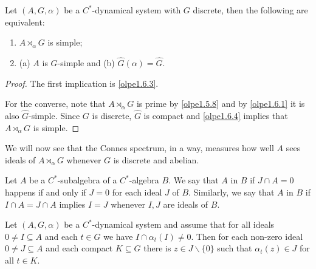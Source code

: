 \begin{theorem}
	Let $(A, G ,\alpha)$ be a $C^*$-dynamical system with $G$ discrete, then the following are equivalent:
	\begin{enumerate}
		\item $A \rtimes_\alpha G$ is simple;
		\item (a) $A$ is $G$-simple and (b) $\hat G(\alpha) = \hat G$.
	\end{enumerate}
	\label{olpe1thm}
\end{theorem}
\begin{proof}
	The first implication is \cref{olpe1.6.3}. 
	
	For the converse, note that $A \rtimes_\alpha G$ is prime by \cref{olpe1.5.8} and by \cref{olpe1.6.1} it is also $\hat G$-simple. Since $G$ is discrete, $\hat G$ is compact and \cref{olpe1.6.4} implies that $A \rtimes_\alpha G$ is simple.
\end{proof}
We will now see that the Connes spectrum, in a way, measures how well $A$ sees ideals of $A \rtimes_\alpha G$ whenever $G$ is discrete and abelian.
\begin{definition}
	Let $A$ be a $C^*$-subalgebra of a $C^*$-algebra $B$. We say that $A$  in $B$ if $J \cap A = 0$ happens if and only if $J = 0$ for each ideal $J$ of $B$. Similarly, we say that $A$  in $B$ if $I \cap A = J \cap A$ implies $I=J$ whenever $I,J$ are ideals of $B$.
\end{definition}
\begin{lemma}
	Let $(A,G,\alpha)$ be a $C^*$-dynamical system and assume that for all ideals $0 \neq I \subseteq A$ and each $t \in G$ we have $I \cap \alpha_t(I) \neq 0$. Then for each non-zero ideal $0 \neq J \subseteq A$ and each compact $K \subseteq G$ there is $z \in J \backslash\{0\}$ such that $\alpha_t(z) \in J$ for all $t \in K$. 
	\label{olpe2.2.1}
\end{lemma}
